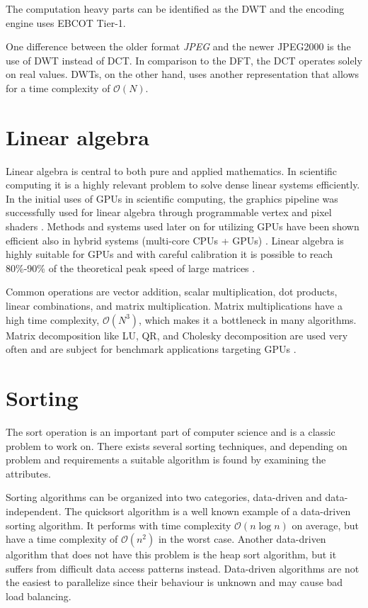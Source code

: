 The computation heavy parts can be identified as the \gls{DWT} and the encoding engine uses \gls{EBCOT} Tier-1.

One difference between the older format \emph{JPEG} and the newer JPEG2000 is the use of \gls{DWT} instead of \gls{DCT}. In comparison to the \gls{DFT}, the \gls{DCT} operates solely on real values. \gls{DWT}s, on the other hand, uses another representation that allows for a time complexity of $\mathcal{O}(N)$.

\section{Linear algebra}
Linear algebra is central to both pure and applied mathematics. In scientific computing it is a highly relevant problem to solve dense linear systems efficiently. In the initial uses of GPUs in scientific computing, the graphics pipeline was successfully used for linear algebra through programmable vertex and pixel shaders \cite{kruger2003linear}. Methods and systems used later on for utilizing \gls{GPU}s have been shown efficient also in hybrid systems (multi-core \gls{CPU}s + \gls{GPU}s) \cite{tomov2010dense}. Linear algebra is highly suitable for \gls{GPU}s and with careful calibration it is possible to reach 80\%-90\% of the theoretical peak speed of large matrices \cite{volkov2008benchmarking}.

Common operations are vector addition, scalar multiplication, dot products, linear combinations, and matrix multiplication. Matrix multiplications have a high time complexity, $\mathcal{O}(N^3)$, which makes it a bottleneck in many algorithms. Matrix decomposition like LU, QR, and Cholesky decomposition are used very often and are subject for benchmark applications targeting \gls{GPU}s \cite{volkov2008benchmarking}.

\section{Sorting}
The sort operation is an important part of computer science and is a classic problem to work on. There exists several sorting techniques, and depending on problem and requirements a suitable algorithm is found by examining the attributes.

Sorting algorithms can be organized into two categories, data-driven and data-independent. The quicksort algorithm is a well known example of a data-driven sorting algorithm. It performs with time complexity $\mathcal{O}(n\log{n})$ on average, but have a time complexity of $\mathcal{O}(n^2)$ in the worst case. Another data-driven algorithm that does not have this problem is the heap sort algorithm, but it suffers from difficult data access patterns instead. Data-driven algorithms are not the easiest to parallelize since their behaviour is unknown and may cause bad load balancing.

